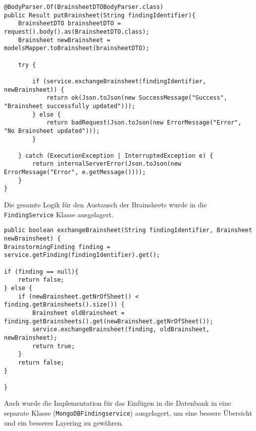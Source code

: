 \begin{lstlisting}[caption={PutBrainsheet nach Refactoring}, label=putBrainsheetNachRef]
@BodyParser.Of(BrainsheetDTOBodyParser.class)
public Result putBrainsheet(String findingIdentifier){
    BrainsheetDTO brainsheetDTO = request().body().as(BrainsheetDTO.class);
    Brainsheet newBrainsheet = modelsMapper.toBrainsheet(brainsheetDTO);

    try {

        if (service.exchangeBrainsheet(findingIdentifier, newBrainsheet)) {
            return ok(Json.toJson(new SuccessMessage("Success", "Brainsheet successfully updated")));
        } else {
            return badRequest(Json.toJson(new ErrorMessage("Error", "No Brainsheet updated")));
        }

    } catch (ExecutionException | InterruptedException e) {
        return internalServerError(Json.toJson(new ErrorMessage("Error", e.getMessage())));
    }
}
\end{lstlisting}

Die gesamte Logik für den Austausch der Brainsheets wurde in die \texttt{FindingService} Klasse ausgelagert.

\begin{lstlisting}[caption={Exchange Brainsheet im Business Layer}, label=exchangeBrainsheetBusinessLayer]
public boolean exchangeBrainsheet(String findingIdentifier, Brainsheet newBrainsheet) {
BrainstormingFinding finding = service.getFinding(findingIdentifier).get();

if (finding == null){
    return false;
} else {
    if (newBrainsheet.getNrOfSheet() < finding.getBrainsheets().size()) {
        Brainsheet oldBrainsheet = finding.getBrainsheets().get(newBrainsheet.getNrOfSheet());
        service.exchangeBrainsheet(finding, oldBrainsheet, newBrainsheet);
        return true;
    }
    return false;
}

}
\end{lstlisting}

Auch wurde die Implementation für das Einfügen in die Datenbank in eine separate Klasse (\texttt{MongoDBFindingservice}) ausgelagert, um eine bessere Übersicht und ein besseres Layering zu gewähren.

